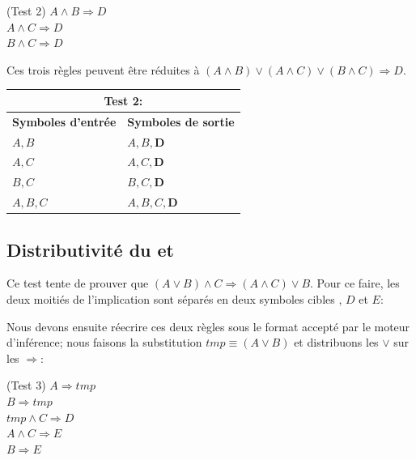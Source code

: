 \documentclass[12pt]{article}
\begin{document}
\begin{algorithm}
\BeginKB(Test 2\label{T2}){
  $A \land B \Rightarrow D$ \\
  $A \land C \Rightarrow D$ \\
  $B \land C \Rightarrow D$ \\
}
\end{algorithm}

Ces trois règles peuvent être réduites à $(A \land B) \lor (A \land C) \lor (B \land C) \Rightarrow D$.

\begin{tabular}{|p{4cm}|p{6.5cm}|}
  \hline
  \multicolumn{2}{|c|}{\textbf{Test 2:}} \\
  \hline
  \textbf{Symboles d'entrée} & \textbf{Symboles de sortie} \\
  \hline
  $A, B$ & $A, B, \mathbf{D}$ \\
  \hline
  $A, C$ & $A, C, \mathbf{D}$ \\
  \hline
  $B, C$ & $B, C, \mathbf{D}$ \\
  \hline
  $A, B, C$ & $A, B, C, \mathbf{D}$ \\
  \hline
\end{tabular}

\subsection{Distributivité du \og et \fg}

Ce test tente de prouver que $(A \lor B) \land C \Rightarrow (A \land C) \lor B$.
Pour ce faire, les deux moitiés de l'implication sont séparés en deux symboles \og cibles \fg, $D$ et $E$:

\begin{algorithm}
\end{algorithm}

Nous devons ensuite réecrire ces deux règles sous le format accepté par le moteur d'inférence; nous faisons la substitution $tmp \equiv (A \lor B)$ et distribuons les $\lor$ sur les $\Rightarrow$:

\begin{algorithm}
\BeginKB(Test 3\label{T3}){
  $A \Rightarrow tmp$ \\
  $B \Rightarrow tmp$ \\
  $tmp \land C \Rightarrow D$ \\

  $A \land C \Rightarrow E$ \\
  $B \Rightarrow E$
}
\end{algorithm}
\end{document}

